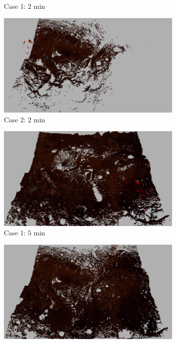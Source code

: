 \documentclass[conf]{new-aiaa}
\begin{document}
\begin{figure}[!t]
\begin{subfigure}[t]{0.4\columnwidth}
        		\caption{Case 1: $2$ min}
		\vspace*{0.025\textwidth}
    	\end{subfigure}
    	\begin{subfigure}[t]{0.4\columnwidth}
           	\centering
          	\includegraphics[height=0.5\textwidth]{MarsRdcdMap2min.jpg}
        		\caption{Case 2: $2$ min}
		\vspace*{0.025\textwidth}
    	\end{subfigure}
	\centering
	\begin{subfigure}[t]{0.4\columnwidth}
           	\centering
          	\includegraphics[height=0.5\textwidth]{MarsFullMap5min.jpg}
        		\caption{Case 1: $5$ min}
		\vspace*{0.025\textwidth}
    	\end{subfigure}
    	\begin{subfigure}[t]{0.4\columnwidth}
           	\centering
          	\includegraphics[height=0.5\textwidth]{MarsRdcdMap5min.jpg}

\end{subfigure}
\end{figure}
\end{document}

